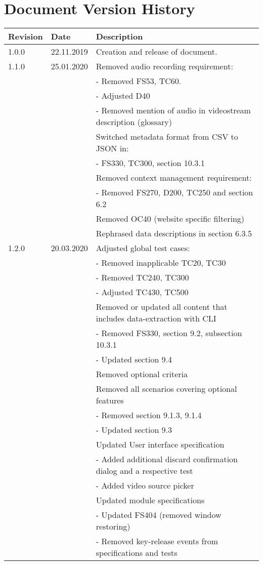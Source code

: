 \chapter*{Document Version History}
\label{ch:versionhistory}
\begin{table}[h]
\begin{tabular}{lll}
\textbf{Revision} & \textbf{Date} & \textbf{Description}              \\
\hline
1.0.0             & 22.11.2019    & Creation and release of document. \\
\hline
1.1.0             & 25.01.2020    & Removed audio recording requirement: \\
&& - Removed FS53, TC60. \\
&& - Adjusted D40 \\
&& - Removed mention of audio in \gls{videostream} description (glossary) \\
&& Switched metadata format from CSV to JSON in:\\
&& - FS330, TC300, section 10.3.1 \\
&& Removed context management requirement:\\
&& - Removed FS270, D200, TC250 and section 6.2\\
&& Removed OC40 (website specific filtering)\\
&& Rephrased data descriptions in section 6.3.5\\
\hline
1.2.0           & 20.03.2020    & Adjusted global test cases: \\
&& - Removed inapplicable TC20, TC30\\
&& - Removed TC240, TC300\\
&& - Adjusted TC430, TC500\\
&& Removed or updated all content that includes data-extraction with CLI\\
&& - Removed FS330, section 9.2, subsection 10.3.1\\
&& - Updated section 9.4\\
&& Removed optional criteria\\
&& Removed all scenarios covering optional features\\
&& - Removed section 9.1.3, 9.1.4\\
&& - Updated section 9.3\\
&& Updated User interface specification\\
&& - Added additional discard confirmation dialog and a respective test\\
&& - Added video source picker\\
&& Updated module specifications\\
&& - Updated FS404 (removed window restoring)\\
&& - Removed key-release events from specifications and tests\\
\end{tabular}
\end{table}